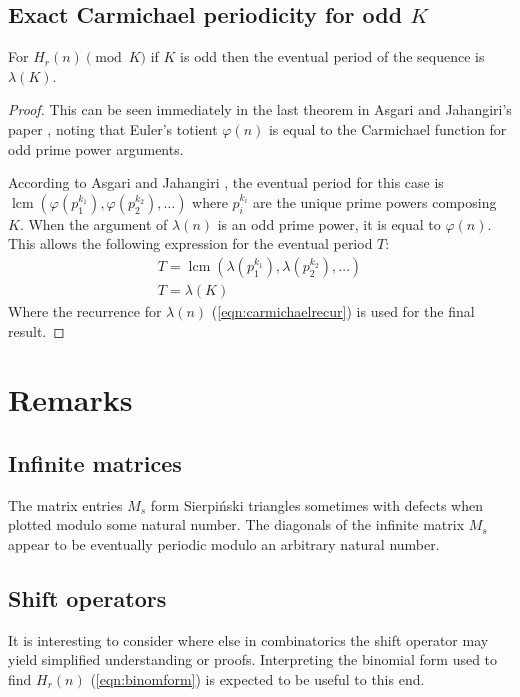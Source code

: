 \documentclass[12pt,reqno]{article}
\DeclareMathOperator{\lcm}{lcm}
\begin{document}
\subsection{Exact Carmichael periodicity for odd $K$}

\begin{theorem}
	For $H_{r}(n) \pmod {K}$ if $K$ is odd then the eventual period of the sequence is $\lambda(K)$.
	\begin{proof}
		This can be seen immediately in the last theorem in Asgari and Jahangiri's paper \cite{cc:asgari}, noting that Euler's totient $\varphi(n)$ is equal to the Carmichael function for odd prime power arguments.

	According to Asgari and Jahangiri \cite{cc:asgari}, the eventual period for this case is $\lcm(\varphi(p_{1}^{k_{1}}), \varphi(p_{2}^{k_{2}}), \ldots)$ where $p_{i}^{k_{i}}$ are the unique prime powers composing $K$. When the argument of $\lambda(n)$ is an odd prime power, it is equal to $\varphi(n)$. This allows the following expression for the eventual period $T$:
		\begin{align}
			T = \lcm(\lambda(p_{1}^{k_{1}}), \lambda(p_{2}^{k_{2}}), \ldots) \\
			T = \lambda(K)
		\end{align}
		Where the recurrence for $\lambda(n)$ (\ref{eqn:carmichaelrecur}) is used for the final result.

	\end{proof}

\end{theorem}

\section{Remarks}

\subsection{Infinite matrices}
\begin{remark}
	The matrix entries $M_{s}$ form Sierpi\'nski triangles sometimes with defects when plotted modulo some natural number. The diagonals of the infinite matrix $M_{s}$ appear to be eventually periodic modulo an arbitrary natural number.
\end{remark}
\subsection{Shift operators}
\begin{remark}
	It is interesting to consider where else in combinatorics the shift operator may yield simplified understanding or proofs. Interpreting the binomial form used to find $H_{r}(n)$ (\ref{eqn:binomform}) is expected to be useful to this end.

\end{remark}
\end{document}
